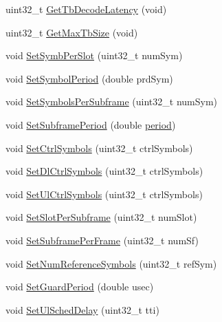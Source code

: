 \begin{DoxyCompactItemize}
\item 
uint32\+\_\+t \hyperlink{classns3_1_1MmWavePhyMacCommon_aae260130bf376846bb01cc49242697b5}{Get\+Tb\+Decode\+Latency} (void)
\item 
uint32\+\_\+t \hyperlink{classns3_1_1MmWavePhyMacCommon_a1049c9f938041d0ec01f92c3436f65f3}{Get\+Max\+Tb\+Size} (void)
\item 
void \hyperlink{classns3_1_1MmWavePhyMacCommon_ac1d53c87d1746f62fef75a2e8c850f55}{Set\+Symb\+Per\+Slot} (uint32\+\_\+t num\+Sym)
\item 
void \hyperlink{classns3_1_1MmWavePhyMacCommon_a836f09a91ca484af46830ec812e59388}{Set\+Symbol\+Period} (double prd\+Sym)
\item 
void \hyperlink{classns3_1_1MmWavePhyMacCommon_a5ed754ff8840ceab9be2ac4ab1e6dfdc}{Set\+Symbols\+Per\+Subframe} (uint32\+\_\+t num\+Sym)
\item 
void \hyperlink{classns3_1_1MmWavePhyMacCommon_a89d23f81b818b399a700ba20ab525bea}{Set\+Subframe\+Period} (double \hyperlink{mmwave_2model_2fading-traces_2fading__trace__generator_8m_ae10c944bf9f3fba2686a5885ecc192d7}{period})
\item 
void \hyperlink{classns3_1_1MmWavePhyMacCommon_a98ef2ca8e340ad4aba166c93ba01f427}{Set\+Ctrl\+Symbols} (uint32\+\_\+t ctrl\+Symbols)
\item 
void \hyperlink{classns3_1_1MmWavePhyMacCommon_abe66a571fc0152f0f069dd60b64a84b2}{Set\+Dl\+Ctrl\+Symbols} (uint32\+\_\+t ctrl\+Symbols)
\item 
void \hyperlink{classns3_1_1MmWavePhyMacCommon_a2fcefebbe37ff095d37d3b6f04d14df4}{Set\+Ul\+Ctrl\+Symbols} (uint32\+\_\+t ctrl\+Symbols)
\item 
void \hyperlink{classns3_1_1MmWavePhyMacCommon_aeadcb3343edce2c0f137a157a024ef70}{Set\+Slot\+Per\+Subframe} (uint32\+\_\+t num\+Slot)
\item 
void \hyperlink{classns3_1_1MmWavePhyMacCommon_ad188aa16f08b4c4b72170f6aa276828e}{Set\+Subframe\+Per\+Frame} (uint32\+\_\+t num\+Sf)
\item 
void \hyperlink{classns3_1_1MmWavePhyMacCommon_a7a04310930356a45696144a67a18f36b}{Set\+Num\+Reference\+Symbols} (uint32\+\_\+t ref\+Sym)
\item 
void \hyperlink{classns3_1_1MmWavePhyMacCommon_a129a903e12ca0c90f38d984cb070b63e}{Set\+Guard\+Period} (double usec)
\item 
void \hyperlink{classns3_1_1MmWavePhyMacCommon_aed2ecc35b4c27e5edb1247e33fa0094d}{Set\+Ul\+Sched\+Delay} (uint32\+\_\+t tti)
\item 

\end{DoxyCompactItemize}
